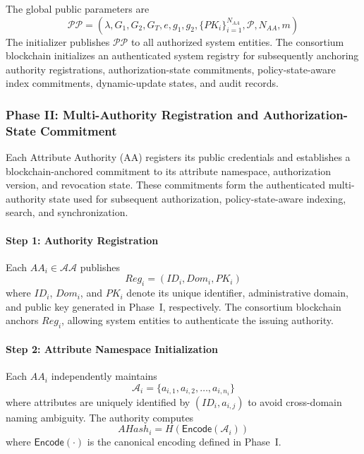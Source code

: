 \documentclass{ieeetj}
\theoremstyle{ieee-style}
\begin{document}
The global public parameters are
\begin{equation}
\mathcal{PP}=
\left(
\lambda,
G_1,G_2,G_T,e,g_1,g_2,
\{PK_i\}_{i=1}^{N_{AA}},
\mathcal{P},
N_{AA},m
\right)
\end{equation}
The initializer publishes $\mathcal{PP}$ to all authorized system
entities. The consortium blockchain initializes an authenticated system
registry for subsequently anchoring authority registrations,
authorization-state commitments, policy-state-aware index commitments,
dynamic-update states, and audit records.

\subsubsection*{\textbf{Phase II: Multi-Authority Registration and
Authorization-State Commitment}}

Each Attribute Authority (AA) registers its public credentials and
establishes a blockchain-anchored commitment to its attribute namespace,
authorization version, and revocation state. These commitments form the
authenticated multi-authority state used for subsequent authorization,
policy-state-aware indexing, search, and synchronization.

\paragraph*{Step 1: Authority Registration}

Each $AA_i\in\mathcal{AA}$ publishes
\begin{equation}
Reg_i=(ID_i,Dom_i,PK_i)
\end{equation}
where $ID_i$, $Dom_i$, and $PK_i$ denote its unique identifier,
administrative domain, and public key generated in Phase~I, respectively.
The consortium blockchain anchors $Reg_i$, allowing system entities to
authenticate the issuing authority.

\paragraph*{Step 2: Attribute Namespace Initialization}

Each $AA_i$ independently maintains
\begin{equation}
\mathcal{A}_i=\{a_{i,1},a_{i,2},\ldots,a_{i,n_i}\}
\end{equation}
where attributes are uniquely identified by $(ID_i,a_{i,j})$ to avoid
cross-domain naming ambiguity. The authority computes
\begin{equation}
AHash_i=
H\!\left(\mathsf{Encode}(\mathcal{A}_i)\right)
\end{equation}
where $\mathsf{Encode}(\cdot)$ is the canonical encoding defined in
Phase~I.
\end{document}
